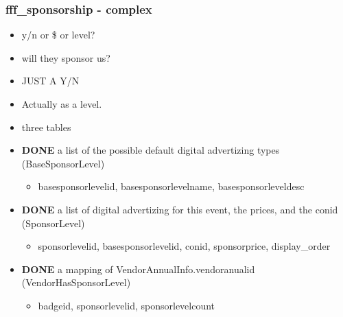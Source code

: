 \documentclass[captions=tablesignature]{scrartcl}
\begin{document}
\subsubsection{fff\_sponsorship - complex}
\label{sec-2-2-6}
\begin{itemize}
\item y/n or \$ or level?
\item will they sponsor us?
\item JUST A Y/N
\item Actually as a level.
\item three tables
\end{itemize}
\begin{itemize}
\item {\bfseries\sffamily DONE} a list of the possible default digital advertizing types (BaseSponsorLevel)
\label{sec-2-2-6-1}
\begin{itemize}
\item basesponsorlevelid, basesponsorlevelname, basesponsorleveldesc
\end{itemize}

\item {\bfseries\sffamily DONE} a list of digital advertizing for this event, the prices, and the conid (SponsorLevel)
\label{sec-2-2-6-2}
\begin{itemize}
\item sponsorlevelid, basesponsorlevelid, conid, sponsorprice, display\_order
\end{itemize}

\item {\bfseries\sffamily DONE} a mapping of VendorAnnualInfo.vendoranualid (VendorHasSponsorLevel)
\label{sec-2-2-6-3}
\begin{itemize}
\item badgeid, sponsorlevelid, sponsorlevelcount
\end{itemize}
\end{itemize}
\end{document}
